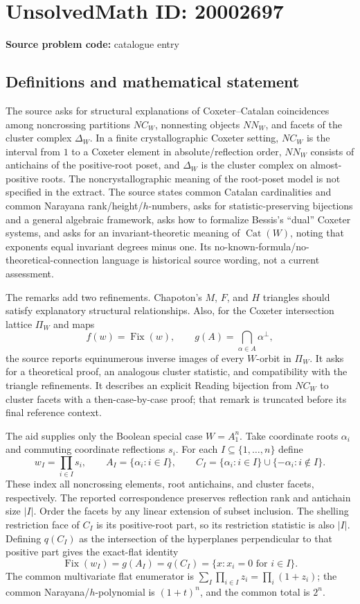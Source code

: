 \documentclass[11pt]{article}
\begin{document}
\section*{UnsolvedMath ID: 20002697}
\textbf{Source problem code:} catalogue entry
\subsection{Definitions and mathematical statement}
The source asks for structural explanations of Coxeter--Catalan coincidences among noncrossing partitions $NC_W$, nonnesting objects $NN_W$, and facets of the cluster complex $\Delta_W$. In a finite crystallographic Coxeter setting, $NC_W$ is the interval from $1$ to a Coxeter element in absolute/reflection order, $NN_W$ consists of antichains of the positive-root poset, and $\Delta_W$ is the cluster complex on almost-positive roots. The noncrystallographic meaning of the root-poset model is not specified in the extract. The source states common Catalan cardinalities and common Narayana rank/height/$h$-numbers, asks for statistic-preserving bijections and a general algebraic framework, asks how to formalize Bessis's ``dual'' Coxeter systems, and asks for an invariant-theoretic meaning of $\operatorname{Cat}(W)$, noting that exponents equal invariant degrees minus one. Its no-known-formula/no-theoretical-connection language is historical source wording, not a current assessment.

The remarks add two refinements. Chapoton's $M$, $F$, and $H$ triangles should satisfy explanatory structural relationships. Also, for the Coxeter intersection lattice $\Pi_W$ and maps
\[
 f(w)=\operatorname{Fix}(w),\qquad
 g(A)=\bigcap_{\alpha\in A}\alpha^\perp,
\]
the source reports equinumerous inverse images of every $W$-orbit in $\Pi_W$. It asks for a theoretical proof, an analogous cluster statistic, and compatibility with the triangle refinements. It describes an explicit Reading bijection from $NC_W$ to cluster facets with a then-case-by-case proof; that remark is truncated before its final reference context.

The aid supplies only the Boolean special case $W=A_1^n$. Take coordinate roots $\alpha_i$ and commuting coordinate reflections $s_i$. For each $I\subseteq\{1,\ldots,n\}$ define
\[
 w_I=\prod_{i\in I}s_i,\qquad
 A_I=\{\alpha_i:i\in I\},\qquad
 C_I=\{\alpha_i:i\in I\}\cup\{-\alpha_i:i\notin I\}.
\]
These index all noncrossing elements, root antichains, and cluster facets, respectively. The reported correspondence preserves reflection rank and antichain size $|I|$. Order the facets by any linear extension of subset inclusion. The shelling restriction face of $C_I$ is its positive-root part, so its restriction statistic is also $|I|$. Defining $q(C_I)$ as the intersection of the hyperplanes perpendicular to that positive part gives the exact-flat identity
\[
 \operatorname{Fix}(w_I)=g(A_I)=q(C_I)
 =\{x:x_i=0\text{ for }i\in I\}.
\]
The common multivariate flat enumerator is $\sum_I\prod_{i\in I}z_i=\prod_i(1+z_i)$; the common Narayana/$h$-polynomial is $(1+t)^n$, and the common total is $2^n$.
\end{document}
